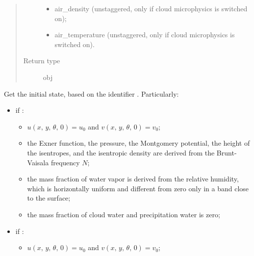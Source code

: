 \documentclass[letterpaper,10pt,english]{sphinxmanual}
\begin{document}
\begin{fulllineitems}
\begin{fulllineitems}
\begin{quote}
\begin{description}
\begin{itemize}
\item {} 
air\_density (unstaggered, only if cloud microphysics is switched on);

\item {} 
air\_temperature (unstaggered, only if cloud microphysics is switched on).

\end{itemize}


\item[{Return type}] \leavevmode
obj

\end{description}\end{quote}

\end{fulllineitems}


\begin{fulllineitems}
\label{\detokenize{api:dycore.dycore_isentropic.DynamicalCoreIsentropic.get_initial_state}}
Get the initial state, based on the identifier . Particularly:
\begin{itemize}
\item {} 
if :
\begin{itemize}
\item {} 
\(u(x, \, y, \, \theta, \, 0) = u_0\) and \(v(x, \, y, \, \theta, \, 0) = v_0\);

\item {} 
the Exner function, the pressure, the Montgomery potential, the height of the isentropes,                             and the isentropic density are derived from the Brunt-Vaisala frequency \(N\);

\item {} 
the mass fraction of water vapor is derived from the relative humidity, which is horizontally uniform                                 and different from zero only in a band close to the surface;

\item {} 
the mass fraction of cloud water and precipitation water is zero;

\end{itemize}

\item {} 
if :
\begin{itemize}
\item {} 
\(u(x, \, y, \, \theta, \, 0) = u_0\) and \(v(x, \, y, \, \theta, \, 0) = v_0\);


\end{itemize}
\end{itemize}
\end{fulllineitems}
\end{fulllineitems}
\end{document}

